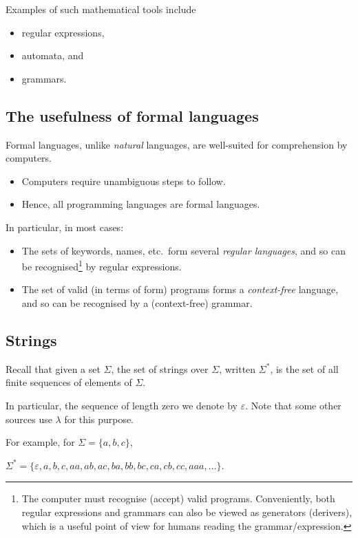 \documentclass[11pt]{article}
\theoremstyle{definition}
\begin{document}
Examples of such mathematical tools include
\begin{itemize}
\item regular expressions,
\item automata, and
\item grammars.
\end{itemize}

\subsection{The usefulness of formal languages}
\label{sec:orgdb74547}

Formal languages, unlike \emph{natural} languages, are well-suited
for comprehension by computers.
\begin{itemize}
\item Computers require unambiguous steps to follow.
\item Hence, all programming languages are formal languages.
\end{itemize}

In particular, in most cases:
\begin{itemize}
\item The sets of keywords, names, etc. form several \emph{regular languages},
and so can be recognised\footnote{The computer must recognise (accept) valid programs.
Conveniently, both regular expressions and grammars
can also be viewed as generators (derivers),
which is a useful point of view
for humans reading the grammar/expression.}
by regular expressions.
\item The set of valid (in terms of form) programs forms
a \emph{context-free} language, and so can be recognised by
a (context-free) grammar.
\end{itemize}

\subsection{Strings}
\label{sec:orgce1dedf}

Recall that given a set \(Σ\), the set of strings over \(Σ\),
written \(Σ^{*}\), is the set of all finite sequences
of elements of \(Σ\).

In particular, the sequence of length zero we denote by \(ε\).
Note that some other sources use \(λ\) for this purpose.

For example, for \(Σ = \{a, b, c\}\),
\begin{center}
\(Σ^{*} = \{ε, a, b, c, aa, ab, ac, ba, bb, bc, ca, cb, cc, aaa, …\}\).
\end{center}
\end{document}
